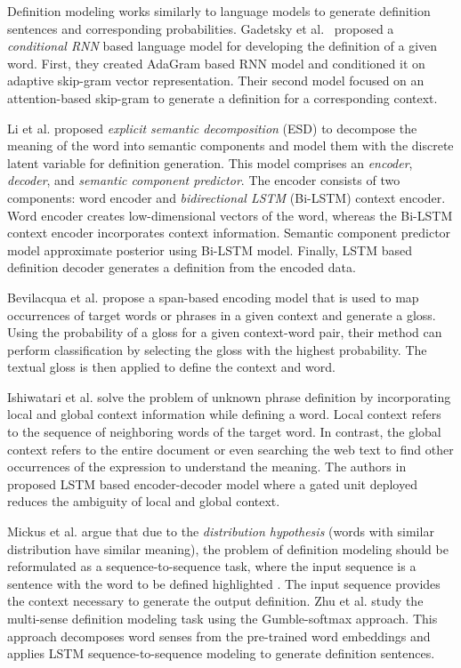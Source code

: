 Definition modeling works similarly to language models to generate definition sentences and corresponding probabilities. Gadetsky et al.~\cite{gadetsky_conditional_2018} proposed a \textit{conditional RNN} based
language model for developing the definition of a given word. First, they created AdaGram based RNN model and conditioned it on adaptive skip-gram vector representation. Their second model focused on an attention-based skip-gram to generate a definition for a corresponding context.

Li et al. \cite{li_explicit_2020} proposed \textit{explicit semantic decomposition} (ESD) to decompose the meaning of the word into semantic components and model them with the discrete latent variable for definition generation. This model comprises an \textit{encoder}, \textit{decoder}, and
\textit{semantic component predictor}. The encoder consists of two components: word encoder and \textit{bidirectional LSTM} (Bi-LSTM) context encoder. Word encoder creates low-dimensional vectors of the word, whereas
the Bi-LSTM context encoder incorporates context information. Semantic component predictor model approximate posterior using Bi-LSTM model.
Finally, LSTM based definition decoder generates a definition from the encoded data.

Bevilacqua et al. \cite{bevilacqua_generationary_2020} propose a span-based
encoding model that is used to map occurrences of target words or phrases in a
given context and generate a gloss. Using the probability of a gloss for a given
context-word pair, their method can perform classification by selecting the
gloss with the highest probability. The textual gloss is then applied to define
the context and word.

Ishiwatari et al. \cite{ishiwatari_learning_2019} solve the problem of unknown
phrase definition by incorporating local and global context information while
defining a word. Local context refers to the sequence of neighboring words of
the target word. In contrast, the global context refers to the entire document
or even searching the web text to find other occurrences of the expression to
understand the meaning. The authors in \cite{ishiwatari_learning_2019} proposed LSTM based encoder-decoder model where a gated unit deployed reduces the ambiguity of local and global context.

Mickus et al. \cite{mickus_mark_2019} argue that due to the \textit{distribution
    hypothesis} (words with similar distribution have similar meaning), the
problem of definition modeling should be reformulated as a
sequence-to-sequence task, where the input sequence is a sentence with the
word to be defined highlighted \cite{mickus_mark_2019}. The input sequence
provides the context necessary to generate the output definition. Zhu et al.
\cite{zhu_multi_2019} study the multi-sense definition modeling task using
the Gumble-softmax approach. This approach decomposes word senses from the
pre-trained word embeddings and applies LSTM sequence-to-sequence modeling
to generate definition sentences.

